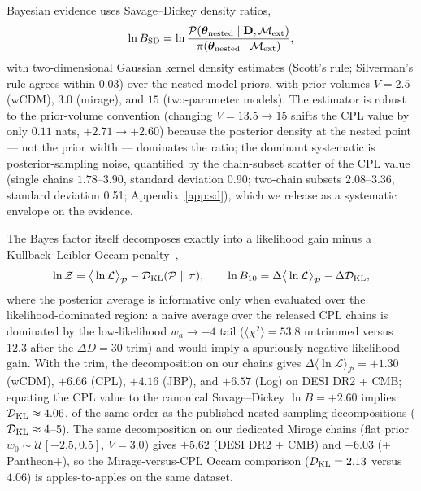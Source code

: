 \documentclass[aps,prd,preprint,superscriptaddress,nofootinbib]{revtex4-2}
\begin{document}
Bayesian evidence uses Savage--Dickey density ratios,
\begin{equation}
\ln B_{\rm SD} = \ln \frac{\mathcal{P}(\boldsymbol{\theta}_{\rm nested} \mid \mathbf{D}, \mathcal{M}_{\rm ext})}{\pi(\boldsymbol{\theta}_{\rm nested} \mid \mathcal{M}_{\rm ext})},
\label{eq:sd}
\end{equation}
with two-dimensional Gaussian kernel density estimates (Scott's rule; Silverman's rule agrees within 0.03) over the nested-model priors, with prior volumes $V = 2.5$ (wCDM), $3.0$ (mirage), and $15$ (two-parameter models). The estimator is robust to the prior-volume convention (changing $V = 13.5 \to 15$ shifts the CPL value by only $0.11$ nats, $+2.71 \to +2.60$) because the posterior density at the nested point --- not the prior width --- dominates the ratio; the dominant systematic is posterior-sampling noise, quantified by the chain-subset scatter of the CPL value (single chains $1.78$--$3.90$, standard deviation 0.90; two-chain subsets $2.08$--$3.36$, standard deviation 0.51; Appendix~\ref{app:sd}), which we release as a systematic envelope on the evidence.

The Bayes factor itself decomposes exactly into a likelihood gain minus a Kullback--Leibler Occam penalty~\cite{Lodha2025},
\begin{equation}
\ln \mathcal{Z} = \big\langle \ln \mathcal{L} \big\rangle_{\mathcal{P}} - \mathcal{D}_{\rm KL}(\mathcal{P} \parallel \pi), \qquad \ln B_{10} = \Delta \big\langle \ln \mathcal{L} \big\rangle_{\mathcal{P}} - \Delta \mathcal{D}_{\rm KL},
\label{eq:decomp}
\end{equation}
where the posterior average is informative only when evaluated over the likelihood-dominated region: a naive average over the released CPL chains is dominated by the low-likelihood $w_a \to -4$ tail ($\langle \chi^2 \rangle = 53.8$ untrimmed versus $12.3$ after the $\Delta D = 30$ trim) and would imply a spuriously negative likelihood gain. With the trim, the decomposition on our chains gives $\Delta \langle \ln \mathcal{L} \rangle_{\mathcal{P}} = +1.30$ (wCDM), $+6.66$ (CPL), $+4.16$ (JBP), and $+6.57$ (Log) on DESI DR2 + CMB; equating the CPL value to the canonical Savage--Dickey $\ln B = +2.60$ implies $\mathcal{D}_{\rm KL} \approx 4.06$, of the same order as the published nested-sampling decompositions ($\mathcal{D}_{\rm KL} \approx 4$--5). The same decomposition on our dedicated Mirage chains (flat prior $w_0 \sim \mathcal{U}[-2.5, 0.5]$, $V = 3.0$) gives $+5.62$ (DESI DR2 + CMB) and $+6.03$ (+ Pantheon+), so the Mirage-versus-CPL Occam comparison ($\mathcal{D}_{\rm KL} = 2.13$ versus $4.06$) is apples-to-apples on the same dataset.
\end{document}
